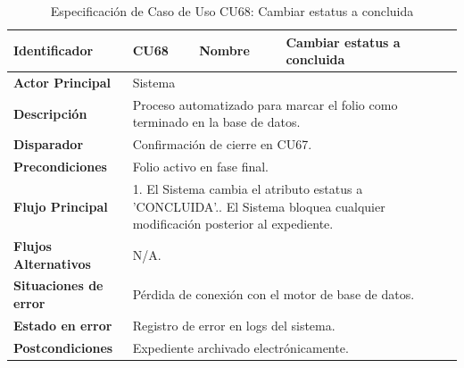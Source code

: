 \begingroup
\setlength{\parskip}{0pt}
\begin{longtable}{|p{3.5cm}|p{2cm}|p{2.5cm}|p{7cm}|}
\caption{Especificación de Caso de Uso CU68: Cambiar estatus a concluida}
\label{tab:cu68} \\
\hline
\textbf{Identificador} & CU68 & \textbf{Nombre} & Cambiar estatus a concluida \\ \hline
\textbf{Actor Principal} & \multicolumn{3}{p{11.5cm}|}{Sistema} \\ \hline
\textbf{Descripción} & \multicolumn{3}{p{11.5cm}|}{Proceso automatizado para marcar el folio como terminado en la base de datos.} \\ \hline
\textbf{Disparador} & \multicolumn{3}{p{11.5cm}|}{Confirmación de cierre en CU67.} \\ \hline
\textbf{Precondiciones} & \multicolumn{3}{p{11.5cm}|}{Folio activo en fase final.} \\ \hline
\textbf{Flujo Principal} & \multicolumn{3}{p{11.5cm}|}{1. El Sistema cambia el atributo estatus a 'CONCLUIDA'.\newline 2. El Sistema bloquea cualquier modificación posterior al expediente.} \\ \hline
\textbf{Flujos Alternativos} & \multicolumn{3}{p{11.5cm}|}{N/A.} \\ \hline
\textbf{Situaciones de error} & \multicolumn{3}{p{11.5cm}|}{Pérdida de conexión con el motor de base de datos.} \\ \hline
\textbf{Estado en error} & \multicolumn{3}{p{11.5cm}|}{Registro de error en logs del sistema.} \\ \hline
\textbf{Postcondiciones} & \multicolumn{3}{p{11.5cm}|}{Expediente archivado electrónicamente.} \\ \hline
\end{longtable}
\endgroup

\vspace{0.8cm}


